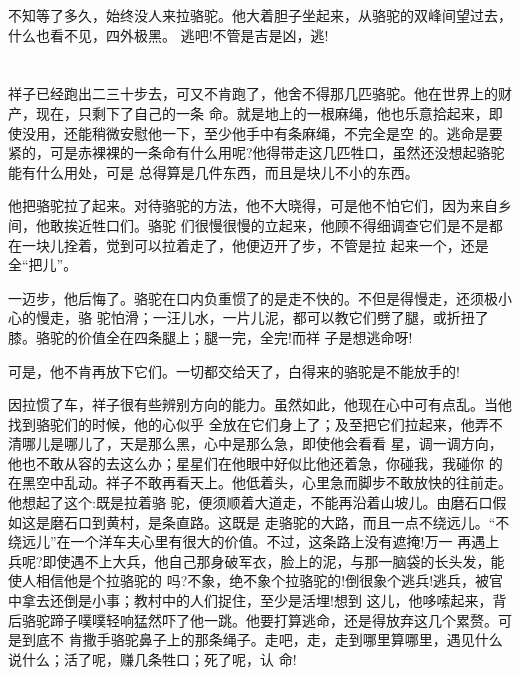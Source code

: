 \documentclass[11pt,a4paper,onecolumn]{article}
\begin{document}
不知等了多久，始终没人来拉骆驼。他大着胆子坐起来，从骆驼的双峰间望过去，什么也看不见，四外极黑。
逃吧!不管是吉是凶，逃!


\pagebreak
\section{}

祥子已经跑出二三十步去，可又不肯跑了，他舍不得那几匹骆驼。他在世界上的财产，现在，只剩下了自己的一条
命。就是地上的一根麻绳，他也乐意拾起来，即使没用，还能稍微安慰他一下，至少他手中有条麻绳，不完全是空
的。逃命是要紧的，可是赤裸裸的一条命有什么用呢?他得带走这几匹牲口，虽然还没想起骆驼能有什么用处，可是
总得算是几件东西，而且是块儿不小的东西。

他把骆驼拉了起来。对待骆驼的方法，他不大晓得，可是他不怕它们，因为来自乡间，他敢挨近牲口们。骆驼
们很慢很慢的立起来，他顾不得细调查它们是不是都在一块儿拴着，觉到可以拉着走了，他便迈开了步，不管是拉
起来一个，还是全``把儿''。

一迈步，他后悔了。骆驼\myrule 在口内负重惯了的\myrule 是走不快的。不但是得慢走，还须极小心的慢走，骆
驼怕滑；一汪儿水，一片儿泥，都可以教它们劈了腿，或折扭了膝。骆驼的价值全在四条腿上；腿一完，全完!而祥
子是想逃命呀!

可是，他不肯再放下它们。一切都交给天了，白得来的骆驼是不能放手的!

因拉惯了车，祥子很有些辨别方向的能力。虽然如此，他现在心中可有点乱。当他找到骆驼们的时候，他的心似乎
全放在它们身上了；及至把它们拉起来，他弄不清哪儿是哪儿了，天是那么黑，心中是那么急，即使他会看看
星，调一调方向，他也不敢从容的去这么办；星星们\myrule 在他眼中\myrule 好似比他还着急，你碰我，我碰你
的在黑空中乱动。祥子不敢再看天上。他低着头，心里急而脚步不敢放快的往前走。他想起了这个:既是拉着骆
驼，便须顺着大道走，不能再沿着山坡儿。由磨石口\myrule 假如这是磨石口\myrule 到黄村，是条直路。这既是
走骆驼的大路，而且一点不绕远儿。``不绕远儿''在一个洋车夫心里有很大的价值。不过，这条路上没有遮掩!万一
再遇上兵呢?即使遇不上大兵，他自己那身破军衣，脸上的泥，与那一脑袋的长头发，能使人相信他是个拉骆驼的
吗?不象，绝不象个拉骆驼的!倒很象个逃兵!逃兵，被官中拿去还倒是小事；教村中的人们捉住，至少是活埋!想到
这儿，他哆嗦起来，背后骆驼蹄子噗噗轻响猛然吓了他一跳。他要打算逃命，还是得放弃这几个累赘。可是到底不
肯撒手骆驼鼻子上的那条绳子。走吧，走，走到哪里算哪里，遇见什么说什么；活了呢，赚几条牲口；死了呢，认
命!
\end{document}
